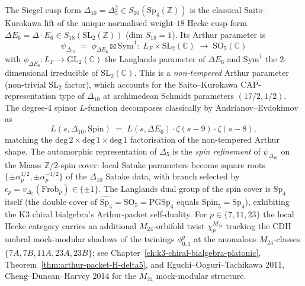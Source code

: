 \begin{remark}
\label{rem:k3e-arthur-packet-delta10}
The Siegel cusp form $\Delta_{10} = \Delta_5^2 \in S_{10}(\mathrm{Sp}_4(\mathbb{Z}))$ is
the classical Saito--Kurokawa lift of the unique normalised weight-$18$ Hecke cusp form
$\Delta E_6 = \Delta\cdot E_6 \in S_{18}(\mathrm{SL}_2(\mathbb{Z}))$ (dim $S_{18} = 1$).
Its Arthur parameter is
\[
 \psi_{\Delta_{10}}
 \;=\;
 \phi_{\Delta E_6} \boxtimes \mathrm{Sym}^1
 \colon\;
 L_F\times\mathrm{SL}_2(\mathbb{C})
 \;\longrightarrow\;
 \mathrm{SO}_5(\mathbb{C})
\]
with $\phi_{\Delta E_6}\colon L_F\to\mathrm{GL}_2(\mathbb{C})$ the Langlands parameter
of $\Delta E_6$ and $\mathrm{Sym}^1$ the $2$-dimensional irreducible of
$\mathrm{SL}_2(\mathbb{C})$. This is a \emph{non-tempered} Arthur parameter
(non-trivial $\mathrm{SL}_2$ factor), which accounts for the Saito--Kurokawa
CAP-representation type of $\Delta_{10}$ at archimedean Schmidt parameters
$(17/2, 1/2)$. The degree-$4$ spinor $L$-function decomposes classically by
Andrianov--Evdokimov as
\[
 L(s,\Delta_{10},\mathrm{Spin})
 \;=\;
 L(s,\Delta E_6)\cdot \zeta(s-9)\cdot \zeta(s-8),
\]
matching the $\mathrm{deg}\,2 \times \mathrm{deg}\,1 \times \mathrm{deg}\,1$ factorisation
of the non-tempered Arthur shape. The automorphic representation of $\Delta_5$ is the
\emph{spin refinement} of $\psi_{\Delta_{10}}$ on the Maass $\mathbb{Z}/2$-spin cover:
local Satake parameters become square roots $\{\pm\alpha_p^{1/2},\pm\alpha_p^{-1/2}\}$
of the $\Delta_{10}$ Satake data, with branch selected by
$\epsilon_p = v_{\Delta_5}(\mathrm{Frob}_p)\in\{\pm 1\}$. The Langlands dual group of the
spin cover is $\mathrm{Sp}_4$ itself (the double cover of
$\widehat{\mathrm{Sp}_4} = \mathrm{SO}_5 = \mathrm{PGSp}_4$ equals
$\mathrm{Spin}_5 = \mathrm{Sp}_4$), exhibiting the K3 chiral bialgebra's Arthur-packet
self-duality. For $p\in\{7,11,23\}$ the local Hecke category carries an additional
$M_{24}$-orbifold twist $\chi^{M_{24}}_p$ tracking the CDH umbral mock-modular shadows
of the twinings $\phi^g_{0,1}$ at the anomalous $M_{24}$-classes
$\{7A, 7B, 11A, 23A, 23B\}$; see Chapter~\ref{ch:k3-chiral-bialgebra-platonic},
Theorem~\ref{thm:arthur-packet-H-delta5}, and Eguchi--Ooguri--Tachikawa 2011,
Cheng--Duncan--Harvey 2014 for the $M_{24}$ mock-modular structure.
\end{remark}

